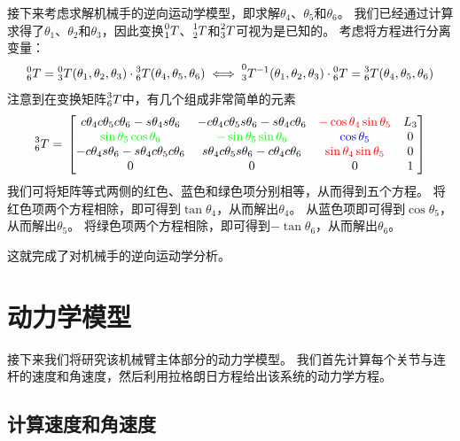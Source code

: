 \documentclass{ctexart}
\begin{document}
接下来考虑求解机械手的逆向运动学模型，即求解$\theta_4$、$\theta_5$和$\theta_6$。
我们已经通过计算求得了$\theta_1$、$\theta_2$和$\theta_3$，因此变换$\prescript{0}{1}{T}$、$\prescript{1}{2}{T}$和$\prescript{2}{3}{T}$可视为是已知的。
考虑将方程进行分离变量：
\[ 
    \prescript{0}{6}{T} = \prescript{0}{3}{T}(\theta_1, \theta_2, \theta_3) \cdot \prescript{3}{6}{T} (\theta_4, \theta_5, \theta_6)
    \iff
    \prescript{0}{3}{T^{-1}} (\theta_1, \theta_2, \theta_3) \cdot \prescript{0}{6}{T} = \prescript{3}{6}{T} (\theta_4, \theta_5, \theta_6)
\]
注意到在变换矩阵$\prescript{3}{6}{T}$中，有几个组成非常简单的元素
\[
    \prescript{3}{6}{T} = \\
    \begin{bmatrix}
        c{{{\theta }_4} } c{ {{\theta }_5} } c{ {{\theta }_6} }-s{ {{\theta }_4} } s{ {{\theta }_6} } & 
        - c{ {{\theta }_4} } c{ {{\theta }_5} } s{ {{\theta }_6} } -s{ {{\theta }_4} } c{ {{\theta }_6} } & 
        \textcolor{red}{- \cos\theta_4 \sin\theta_5 } &
        {L_3}\\
        \textcolor{green}{\sin{ {{\theta }_5} } \cos{ {{\theta }_6} }} & 
        \textcolor{green}{- \sin{ {{\theta }_5} } \sin{ {{\theta }_6} }}  & 
        \textcolor{blue}{\cos{ {{\theta }_5} }}
        & 0\\
        - c{{{\theta }_4}} s{ {{\theta }_6} } -s{ {{\theta }_4} } c{ {{\theta }_5} } c{ {{\theta }_6} } &
        s{ {{\theta }_4} } c{ {{\theta }_5} } s{ {{\theta }_6} }-c{ {{\theta }_4} } c{ {{\theta }_6} } &
        \textcolor{red}{ \sin\theta_4 \sin\theta_5} & 0\\
        0 & 0 & 0 & 1
    \end{bmatrix}
\]
我们可将矩阵等式两侧的红色、蓝色和绿色项分别相等，从而得到五个方程。
将红色项两个方程相除，即可得到$\tan \theta_4$，从而解出$\theta_4$。
从蓝色项即可得到$\cos \theta_5$，从而解出$\theta_5$。
将绿色项两个方程相除，即可得到$- \tan \theta_6$，从而解出$\theta_6$。

这就完成了对机械手的逆向运动学分析。

\section{动力学模型}

接下来我们将研究该机械臂主体部分的动力学模型。
我们首先计算每个关节与连杆的速度和角速度，然后利用拉格朗日方程给出该系统的动力学方程。

\subsection{计算速度和角速度}
\end{document}
